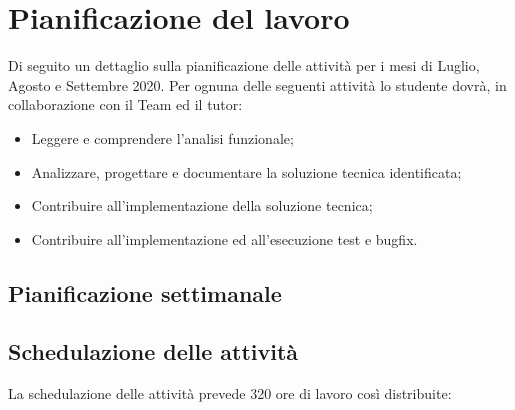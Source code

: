 
\section{Pianificazione del lavoro}
Di seguito un dettaglio sulla pianificazione delle attività per i mesi di Luglio, Agosto e Settembre 2020.
Per ognuna delle seguenti attività lo studente dovrà, in collaborazione con il Team ed il tutor:
\begin{itemize}
	\item Leggere e comprendere l’analisi funzionale;
	\item Analizzare, progettare e documentare la soluzione tecnica identificata;
	\item Contribuire all’implementazione della soluzione tecnica;
	\item Contribuire all’implementazione ed all’esecuzione test e bugfix.
\end{itemize}

\subsection{Pianificazione settimanale}
\prospettoSettimanale


\subsection{Schedulazione delle attività}

La schedulazione delle attività prevede 320 ore di lavoro così distribuite:

\begin{center}
    
\end{center}


